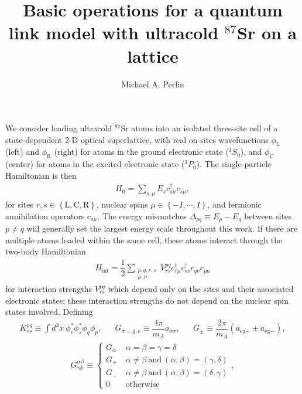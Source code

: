 \documentclass[aps,nofootinbib,notitlepage,11pt]{revtex4-1}
\renewcommand{\t}{\text} %
\newcommand{\f}[2]{\dfrac{#1}{#2}} %
\newcommand{\p}[1]{\left(#1\right)} %
\renewcommand{\set}[1]{\left\{#1\right\}} %
\newcommand{\g}{\text{g}}
\newcommand{\e}{\text{e}}
\renewcommand{\L}{\text{L}}
\newcommand{\C}{\text{C}}
\newcommand{\R}{\text{R}}
\newcommand{\1}{\mathds{1}}
\begin{document}
\title{Basic operations for a quantum link model with ultracold
  $^{87}$Sr on a lattice}

\author{Michael A. Perlin}

\maketitle

We consider loading ultracold $^{87}$Sr atoms into an isolated
three-site cell of a state-dependent 2-D optical superlattice, with
real on-sites wavefunctions $\phi_\L$ (left) and $\phi_\R$ (right) for
atoms in the ground electronic state ($^1S_0$), and $\phi_\C$ (center)
for atoms in the excited electronic state ($^3P_0$).  The
single-particle Hamiltonian is then
\begin{align}
  H_0 = \sum_{s,\mu} E_s c_{s\mu}^\dag c_{s\mu},
\end{align}
for sites $r,s\in\set{\L,\C,\R}$, nuclear spins
$\mu\in\set{-I,\cdots,I}$, and fermionic annihilation operators
$c_{s\mu}$.  The energy mismatches $\Delta_{pq}\equiv E_p-E_q$ between
sites $p\ne q$ will generally set the largest energy scale throughout
this work.  If there are multiple atoms loaded within the same cell,
these atoms interact through the two-body Hamiltonian
\begin{align}
  H_{\t{int}} = \f12 \sum_{\substack{p,q,r,s\\\mu,\nu}}
  V^{pq}_{rs} c_{r\mu}^\dag c_{s\nu}^\dag c_{q\nu} c_{p\mu}
  \label{eq:H_int_full}
\end{align}
for interaction strengths $V^{pq}_{rs}$ which depend only on the sites
and their associated electronic states; these interaction strengths do
not depend on the nuclear spin states involved.  Defining
\begin{align}
  K^{pq}_{rs} \equiv \int d^3x~ \phi_r^* \phi_s^* \phi_q \phi_p,
  &&
  G_{\sigma=\g,\e} \equiv \f{4\pi}{m_A} a_{\sigma\sigma},
  &&
  G_\pm \equiv \f{2\pi}{m_A} \p{a_{\e\g+} \pm a_{\e\g-}},
\end{align}
\begin{align}
  G^{\alpha\beta}_{\gamma\delta} \equiv \left\{
    \begin{array}{ll}
      G_\alpha & ~ \alpha = \beta = \gamma = \delta \\
      G_+ & ~ \alpha \ne \beta ~ \t{and} ~
            (\alpha,\beta) = (\gamma,\delta) \\
      G_- & ~ \alpha \ne \beta ~ \t{and} ~
            (\alpha,\beta) = (\delta,\gamma) \\
      0 & ~ \t{otherwise}
    \end{array}\right.,
\end{align}
\end{document}
